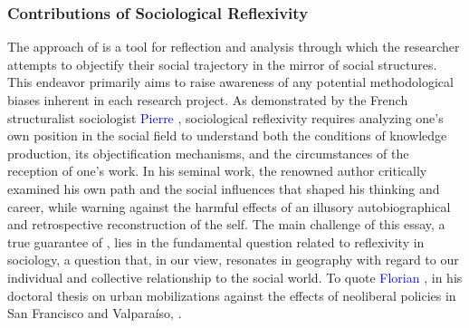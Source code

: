 \begin{refsegment}
\subsubsection*{Contributions of Sociological Reflexivity
    \label{chap3:theorie-auto-analyse-sociologique}
    }
    
The approach of  is a tool for reflection and analysis through which the researcher attempts to objectify their social trajectory in the mirror of social structures. This endeavor primarily aims to raise awareness of any potential methodological biases inherent in each research project. As demonstrated by the French structuralist sociologist \textcolor{blue}{Pierre} \textcolor{blue}{\textcite[162]{bourdieu_esquisse_2004}}, sociological reflexivity requires analyzing one's own position in the social field to understand both the conditions of knowledge production, its objectification mechanisms, and the circumstances of the reception of one's work. In his seminal work, the renowned author critically examined his own path and the social influences that shaped his thinking and career, while warning against the harmful effects of an illusory autobiographical and retrospective reconstruction of the self. The main challenge of this essay, a true guarantee of  \textcolor{blue}{\autocite[3]{roza_p_2006}}, lies in the fundamental question related to reflexivity in sociology, a question that, in our view, resonates in geography with regard to our individual and collective relationship to the social world. To quote \textcolor{blue}{Florian} \textcolor{blue}{\textcite[71]{opillard_we_2018}}, in his doctoral thesis on urban mobilizations against the effects of neoliberal policies in San Francisco and Valparaíso, .%


\end{refsegment}
